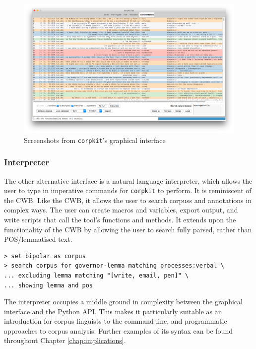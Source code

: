 \begin{figure}[htb]
\begin{minipage}[b]{0.5\linewidth}
    \vspace{1ex}
  \end{minipage}%
  \begin{minipage}[b]{0.5\linewidth}
    \centering
    \includegraphics[width=.98\linewidth]{../images/conco} 
    
    \vspace{1ex}
  \end{minipage} 
  \caption{Screenshots from \texttt{corpkit}'s graphical interface}
  \label{fig:gui-screenshots} 
\end{figure}

\subsubsection{Interpreter}

The other alternative interface is a natural language interpreter, which allows the user to type in imperative commands for \texttt{corpkit} to perform. It is reminiscent of the \gls{CWB}. Like the \gls{CWB}, it allows the user to search \glspl{corpus} and annotations in complex ways. The user can create macros and variables, export output, and write scripts that call the tool's functions and methods. It extends upon the functionality of the \gls{CWB} by allowing the user to search fully parsed, rather than \gls{POS}\slash lemmatised text.

\begin{verbatim}
> set bipolar as corpus
> search corpus for governor-lemma matching processes:verbal \
... excluding lemma matching "[write, email, pen]" \
... showing lemma and pos
\end{verbatim}
%
\noindent The interpreter occupies a middle ground in complexity between the graphical interface and the Python \gls{API}. This makes it particularly suitable as an introduction for corpus linguists to the command line, and programmatic approaches to corpus analysis. Further examples of its syntax can be found throughout Chapter \ref{chap:implications}.

